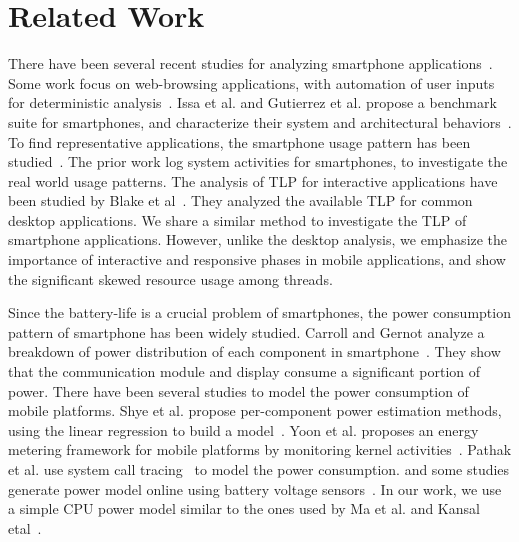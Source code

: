 \section{Related Work}

There have been several recent studies for analyzing smartphone applications~\cite{anatomizing, WhySlowBrowser, tmapp, characterinteractive}.
Some work focus on web-browsing applications, with automation of user inputs for deterministic analysis~\cite{anatomizing, WhySlowBrowser}.
Issa et al. and Gutierrez et al. propose a benchmark suite for smartphones,
and characterize their system and architectural behaviors~\cite{tmapp, characterinteractive}. 
To find representative applications, the smartphone usage pattern has been studied~\cite{diversity,intothewild,diversebehavior}.
The prior work log system activities for smartphones, to investigate the real world usage patterns.
The analysis of TLP for interactive applications have been studied by Blake et al~\cite{desktopTLP}. They
analyzed the available TLP for common desktop applications. We share a similar method to
investigate the TLP of smartphone applications. However, unlike the desktop analysis,
we emphasize the importance of interactive and responsive phases in mobile applications,
and show the significant skewed resource usage among threads.

Since the battery-life is a crucial problem of smartphones,
the power consumption pattern of smartphone has been widely studied.
Carroll and Gernot analyze a breakdown of power distribution of each component in smartphone~\cite{smartphonepower}.
They show that the communication module and display consume a significant portion of power.
There have been several studies to model the power consumption of mobile platforms.
Shye et al.  propose per-component power estimation methods, using the linear regression to build a model~\cite{intothewild}.
Yoon et al. proposes an energy metering framework for mobile platforms by monitoring kernel activities~\cite{AppScope}.
Pathak et al. use system call tracing~\cite{powermodelsyscall} to model the power consumption.
and some studies generate power model online using battery voltage sensors~\cite{selfconstructive, accurateonline}. 
In our work, we use a simple CPU power model similar to the ones used by Ma et al. and Kansal etal~\cite{isca11DVFS, VMpower}.

